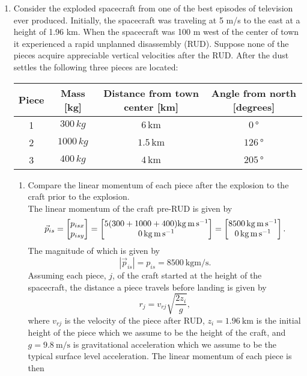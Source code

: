 \documentclass[a4paper, 12pt]{config/homework}
\begin{document}

\begin{enumerate}
\item Consider the exploded spacecraft from one of the best episodes of television ever produced. Initially, the spacecraft was traveling at 5 m/s to the east at a height of 1.96 km. When the spacecraft was 100 m west of the center of town it experienced a rapid unplanned disassembly (RUD). Suppose none of the pieces acquire appreciable vertical velocities after the RUD.
After the dust settles the following three pieces are located:
\begin{table}[h]
    \centering
    \begin{tabular}{cccc}
    Piece & Mass [kg] & Distance from town center [km] & Angle from north [degrees] \\ \midrule
    1 & \(300\,\unit{kg}\) & \(6\, \unit{\kilo\meter}\) & \(0\, \unit{\degree}\) \\
    2 & \(1000\, \unit{kg}\) & \(1.5\, \unit{\kilo\meter}\) & \(126\, \unit{\degree}\) \\
    3 & \(400\, \unit{kg}\) & \(4\, \unit{\kilo\meter}\) & \(205\, \unit{\degree}\)
    \end{tabular}
    \end{table}
\begin{enumerate}[label=\Alph*.]
\item Compare the linear momentum of each piece after the explosion to the craft prior to the explosion.
\\ The linear momentum of the craft pre-RUD is given by
\[\vec{p}_{is} = \matr{p_{isx} \\ p_{isy}} = \matr{5(300+1000+400) \unit{\kg\meter\per\second} \\ 0\,\unit{\kg\meter\per\second}} = \matr{\qty{8500}{\kg\meter\per\second} \\ 0\,\unit{\kg\meter\per\second}}.\]
The magnitude of which is given by
\[|\vec{p}_{is}| = p_{is} = \qty{8500}{\kg\meter\per\second}.\]
Assuming each piece, \(j\), of the craft started at the height of the spacecraft, the distance a piece travels before landing is given by
\[r_j = v_{rj}\sqrt{\frac{2 z_i}{g}},\]
where \(v_{rj}\) is the velocity of the piece after RUD, \(z_i=\qty{1.96}{\kilo\meter}\) is the initial height of the piece which we assume to be the height of the craft, and \\ \( g = \qty{9.8}{\meter\per\second} \) is gravitational acceleration which we assume to be the typical surface level acceleration. The linear momentum of each piece is then

\end{enumerate}
\end{enumerate}
\end{document}
